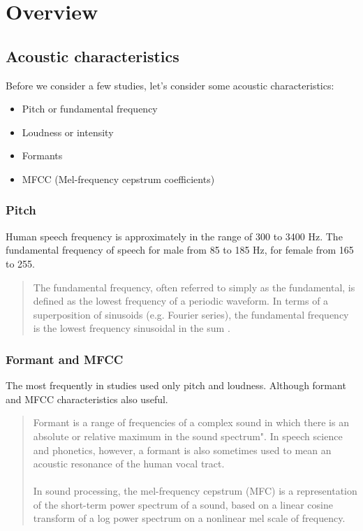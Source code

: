 \documentclass[12pt, letterpaper]{article}
\begin{document}
\section{Overview}
\subsection{Acoustic characteristics}
Before we consider a few studies, let's consider some acoustic characteristics:
\begin{itemize}
	\item Pitch or fundamental frequency
	\item Loudness or intensity
	\item Formants
	\item MFCC (Mel-frequency cepstrum coefficients)
\end{itemize}

\subsubsection{Pitch}
Human speech frequency is approximately in the range of 300 to 3400 Hz. The fundamental frequency of speech for male from 85 to 185 Hz, for female from 165 to 255.
\begin{quote}
The fundamental frequency, often referred to simply as the fundamental, is defined as the lowest frequency of a periodic waveform. In terms of a superposition of sinusoids (e.g. Fourier series), the fundamental frequency is the lowest frequency sinusoidal in the sum \cite{wiki1}.
\end{quote}

\subsubsection{Formant and MFCC}
The most frequently in studies used only pitch and loudness. Although formant and MFCC characteristics also useful.
\begin{quote}
Formant is a range of frequencies of a complex sound in which there is an absolute or relative maximum in the sound spectrum". In speech science and phonetics, however, a formant is also sometimes used to mean an acoustic resonance of the human vocal tract.\cite{wiki2}
\\
\\
In sound processing, the mel-frequency cepstrum (MFC) is a representation of the short-term power spectrum of a sound, based on a linear cosine transform of a log power spectrum on a nonlinear mel scale of frequency\cite{wiki3}.
\end{quote}
\end{document}
